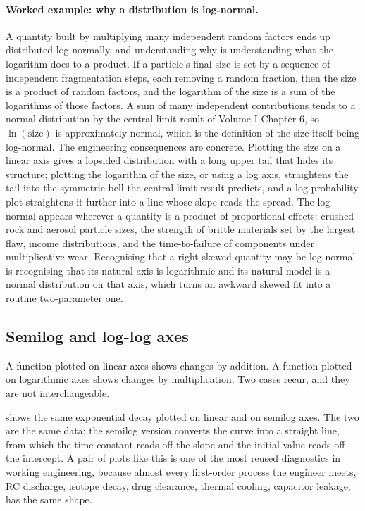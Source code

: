 \paragraph{Worked example: why a distribution is log-normal.}
A quantity built by multiplying many independent random factors ends up
distributed log-normally, and understanding why is understanding what
the logarithm does to a product. If a particle's final size is set by a
sequence of independent fragmentation steps, each removing a random
fraction, then the size is a product of random factors, and the
logarithm of the size is a sum of the logarithms of those factors. A
sum of many independent contributions tends to a normal distribution
by the central-limit result of Volume I Chapter 6, so $\ln(\text{size})$
is approximately normal, which is the definition of the size itself
being log-normal. The engineering consequences are concrete. Plotting
the size on a linear axis gives a lopsided distribution with a long
upper tail that hides its structure; plotting the logarithm of the size,
or using a log axis, straightens the tail into the symmetric bell the
central-limit result predicts, and a log-probability plot straightens
it further into a line whose slope reads the spread. The log-normal
appears wherever a quantity is a product of proportional effects:
crushed-rock and aerosol particle sizes, the strength of brittle
materials set by the largest flaw, income distributions, and the
time-to-failure of components under multiplicative wear. Recognising
that a right-skewed quantity may be log-normal is recognising that its
natural axis is logarithmic and its natural model is a normal
distribution on that axis, which turns an awkward skewed fit into a
routine two-parameter one.

\subsection{Semilog and log-log axes}

A function plotted on linear axes shows changes by addition. A
function plotted on logarithmic axes shows changes by multiplication.
Two cases recur, and they are not interchangeable.



 shows the same exponential decay
plotted on linear and on semilog axes. The two are the same data;
the semilog version converts the curve into a straight line, from
which the time constant reads off the slope and the initial value
reads off the intercept. A pair of plots like this is one of the
most reused diagnostics in working engineering, because almost every
first-order process the engineer meets, RC discharge, isotope decay,
drug clearance, thermal cooling, capacitor leakage, has the same
shape.

